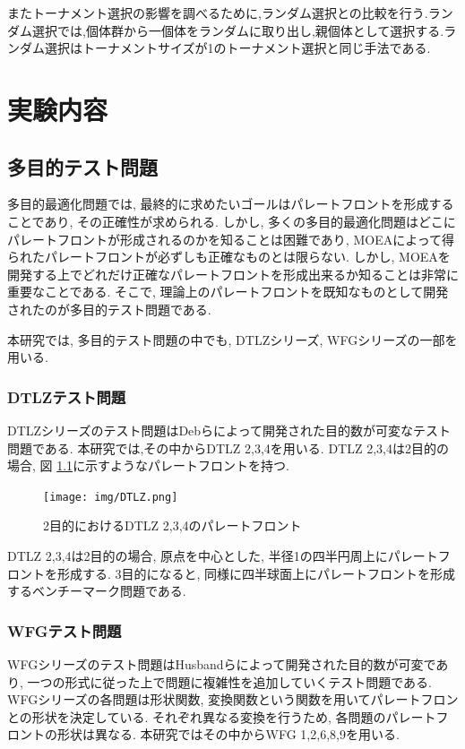 \documentclass[12pt,a4j,notitlepage]{jreport}
\begin{document}
またトーナメント選択の影響を調べるために,ランダム選択との比較を行う.ランダム選択では,個体群から一個体をランダムに取り出し,親個体として選択する.ランダム選択はトーナメントサイズが1のトーナメント選択と同じ手法である.


\chapter{実験内容}
\section{多目的テスト問題}
多目的最適化問題では, 最終的に求めたいゴールはパレートフロントを形成することであり, その正確性が求められる.
しかし, 多くの多目的最適化問題はどこにパレートフロントが形成されるのかを知ることは困難であり, MOEAによって得られたパレートフロントが必ずしも正確なものとは限らない.
しかし, MOEAを開発する上でどれだけ正確なパレートフロントを形成出来るか知ることは非常に重要なことである.
そこで, 理論上のパレートフロントを既知なものとして開発されたのが多目的テスト問題である.

本研究では, 多目的テスト問題の中でも, DTLZシリーズ\cite{DTLZ}, WFGシリーズ\cite{WFG1,WFG2}の一部を用いる.

\subsection{DTLZテスト問題}
DTLZシリーズのテスト問題はDebらによって開発された目的数が可変なテスト問題である.
本研究では,その中からDTLZ 2,3,4を用いる.
DTLZ 2,3,4は2目的の場合, 図 \ref{fig:pareto_dtlz}に示すようなパレートフロントを持つ.
\begin{figure}[htbp]
	\begin{center}
		\texttt{[image: img/DTLZ.png]}
             		\setlength{\abovecaptionskip}{0mm}
		\setlength{\belowcaptionskip}{0mm}
			\caption{2目的におけるDTLZ 2,3,4のパレートフロント}
	\label{fig:pareto_dtlz}
	\end{center}
\end{figure}
DTLZ 2,3,4は2目的の場合, 原点を中心とした, 半径1の四半円周上にパレートフロントを形成する.
3目的になると, 同様に四半球面上にパレートフロントを形成するベンチーマーク問題である.

\subsection{WFGテスト問題}
WFGシリーズのテスト問題はHusbandらによって開発された目的数が可変であり, 一つの形式に従った上で問題に複雑性を追加していくテスト問題である.
WFGシリーズの各問題は形状関数, 変換関数という関数を用いてパレートフロンとの形状を決定している.
それぞれ異なる変換を行うため, 各問題のパレートフロントの形状は異なる.
本研究ではその中からWFG 1,2,6,8,9を用いる.
\end{document}
